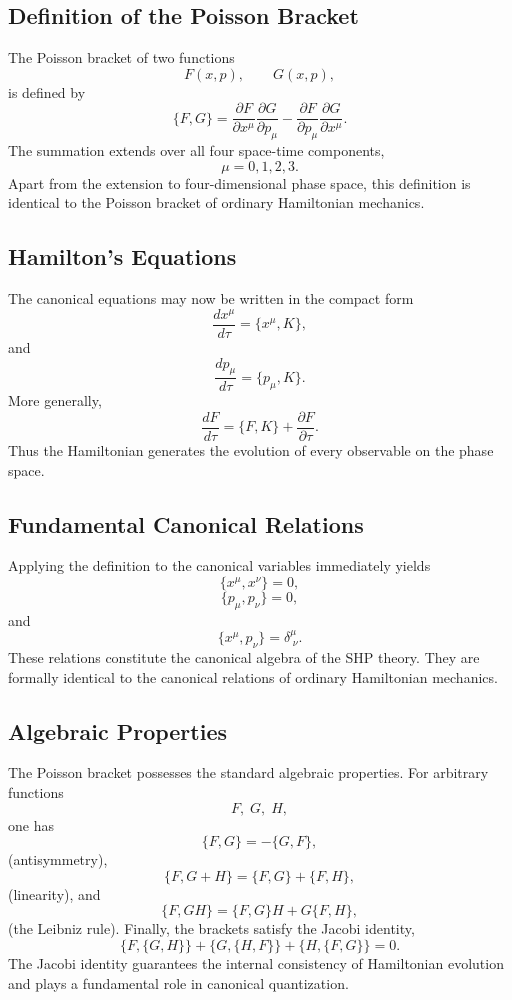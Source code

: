 \subsection{Definition of the Poisson Bracket}
The Poisson bracket of two functions
\[F(x,p),\qquad G(x,p),\]
is defined by
\[\boxed{\{F,G\}=\frac{\partial F}{\partial x^\mu}\frac{\partial G}{\partial p_\mu}
-\frac{\partial F}{\partial p_\mu}\frac{\partial G}{\partial x^\mu}.}\]
The summation extends over all four space-time components,
\[\mu=0,1,2,3.\]
Apart from the extension to four-dimensional phase space, this
definition is identical to the Poisson bracket of ordinary Hamiltonian
mechanics.
\subsection{Hamilton's Equations}
The canonical equations may now be written in the compact form
\[\boxed{\frac{dx^\mu}{d\tau}=\{x^\mu,K\},}\]
and
\[\boxed{\frac{dp_\mu}{d\tau}=\{p_\mu,K\}.}\]
More generally,
\[\boxed{\frac{dF}{d\tau}=\{F,K\}+\frac{\partial F}{\partial\tau}.}\]
Thus the Hamiltonian generates the evolution of every observable on the
phase space.
\subsection{Fundamental Canonical Relations}
Applying the definition to the canonical variables immediately yields
\[\boxed{\{x^\mu,x^\nu\}=0,}\]
\[\boxed{\{p_\mu,p_\nu\}=0,}\]
and
\[\boxed{\{x^\mu,p_\nu\}=\delta^\mu_{\;\nu}.}\]
These relations constitute the canonical algebra of the SHP theory.
They are formally identical to the canonical relations of ordinary
Hamiltonian mechanics.
\subsection{Algebraic Properties}
The Poisson bracket possesses the standard algebraic properties.
For arbitrary functions
\[F,\;G,\;H,\]
one has
\[\{F,G\}=-\{G,F\},\]
(antisymmetry),
\[\{F,G+H\}=\{F,G\}+\{F,H\},\]
(linearity),
and
\[\{F,GH\}=\{F,G\}H+G\{F,H\},\]
(the Leibniz rule).
Finally, the brackets satisfy the Jacobi identity,
\[\boxed{\{F,\{G,H\}\}+\{G,\{H,F\}\}+\{H,\{F,G\}\}=0.}\]
The Jacobi identity guarantees the internal consistency of Hamiltonian
evolution and plays a fundamental role in canonical quantization.

